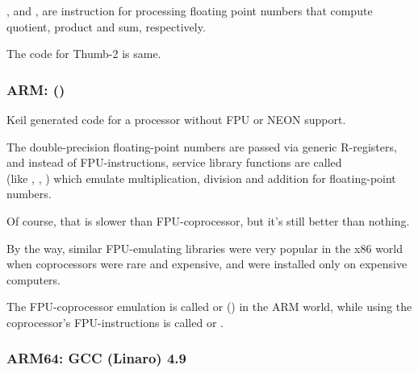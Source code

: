 ,  and , 
are instruction for processing floating point numbers that compute \gls{quotient}, 
\gls{product} and sum, respectively.

The code for Thumb-2 is same.

\subsubsection{ARM: \OptimizingKeilVI (\ThumbMode)}



Keil generated code for a processor without FPU or NEON support.

The double-precision floating-point numbers are passed via generic R-registers,
and instead of FPU-instructions, service library functions are called\\
(like , , )
which emulate multiplication, division and addition for floating-point numbers.

Of course, that is slower than FPU-coprocessor, but it's still better than nothing.

By the way, similar FPU-emulating libraries were very popular in the x86 world when coprocessors were rare
and expensive, and were installed only on expensive computers.


The FPU-coprocessor emulation is called  or  () in the ARM world, 
while using the coprocessor's FPU-instructions is called  or .

\iffalse
\myindex{Raspberry Pi}

For example, the Linux kernel for Raspberry Pi is compiled in two variants.

In the \IT{soft float} case, arguments are passed via R-registers, and in the \IT{hard float} case---via D-registers.

And that is what stops you from using armhf-libraries from armel-code or vice versa,
and that is why all the code in Linux distributions must be compiled according to a single convention.
\fi

\subsubsection{ARM64: \Optimizing GCC (Linaro) 4.9}

